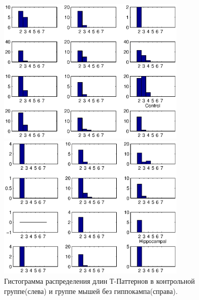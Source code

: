 \documentclass[12pt]{report}
\begin{document}
\begin{figure}[H]
	\begin{multicols}{2}
	\hfill
	\includegraphics[width=90mm]{hTC.eps}

	\includegraphics[width=90mm]{hTH.eps}
	\end{multicols}
	\caption{Гистограмма распределения длин Т-Паттернов в контрольной группе(слева) и группе мышей без гиппокампа(справа).}
\end{figure}


\newpage
\end{document}
